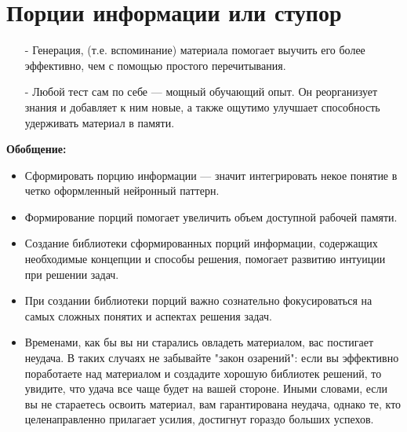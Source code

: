 \documentclass{article}
\begin{document}
\section{Порции информации или ступор}
\begin{itemize}
\item[-] Генерация, (т.е. вспоминание) материала помогает выучить его более эффективно, чем с помощью простого перечитывания.
\item[-] Любой тест сам по себе --- мощный обучающий опыт. Он реорганизует знания и добавляет к ним новые, а также ощутимо улучшает способность удерживать материал в памяти.
\end{itemize}
\textbf{Обобщение:}
\begin{itemize}
\item Сформировать порцию информации --- значит интегрировать некое понятие в четко оформленный нейронный паттерн.
\item Формирование порций помогает увеличить объем доступной рабочей памяти.
\item Создание библиотеки сформированных порций информации, содержащих необходимые концепции и способы решения, помогает развитию интуиции при решении задач.
\item При создании библиотеки порций важно сознательно фокусироваться на самых сложных понятих и аспектах решения задач.
\item Временами, как бы вы ни старались овладеть материалом, вас постигает неудача. В таких случаях не забывайте "закон озарений": если вы эффективно поработаете над материалом и создадите хорошую библиотек решений, то увидите, что удача все чаще будет на вашей стороне. Иными словами, если вы не стараетесь освоить материал, вам гарантирована неудача, однако те, кто целенаправленно прилагает усилия, достигнут гораздо больших успехов.
\end{itemize}
\end{document}
